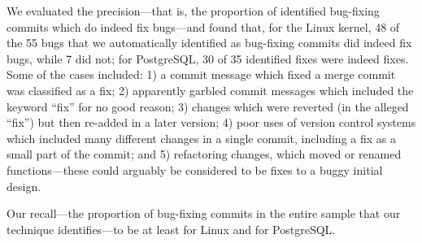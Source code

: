 \begin{table}[tbh]
\centering
\small
{}
\caption{\label{tbl-confusion}Confusion matrices}
\end{table}


We evaluated the precision---that is, the proportion of identified bug-fixing
commits which do indeed fix bugs---and found that, for the Linux kernel, 48 of
the 55 bugs that we automatically identified as bug-fixing commits did indeed
fix bugs, while 7 did not; for PostgreSQL, 30 of 35 identified fixes were indeed
fixes.  Some of the cases included: 1) a commit message which fixed a merge
commit was classified as a fix; 2) apparently garbled commit messages which
included the keyword ``fix'' for no good reason; 3) changes which were reverted
(in the alleged ``fix'') but then re-added in a later version; 4) poor uses of
version control systems which included many different changes in a single
commit, including a fix as a small part of the commit; and 5) refactoring
changes, which moved or renamed functions---these could arguably be considered
to be fixes to a buggy initial design.

Our recall---the proportion of bug-fixing commits in the entire sample that our
technique identifies---to be at least \linuxR for Linux and \postR for
PostgreSQL.
